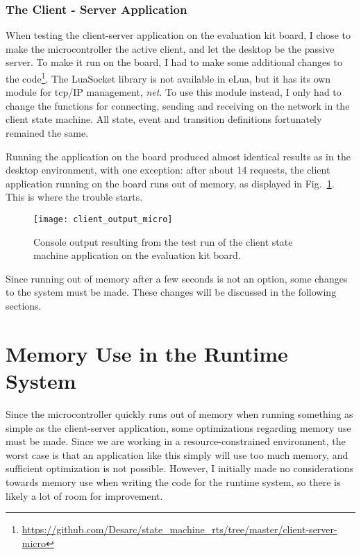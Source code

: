 \subsubsection{The Client - Server Application}
When testing the client-server application on the evaluation kit board, I chose to make the microcontroller the active client, and let the desktop be the passive server. To make it run on the board, I had to make some additional changes to the code\footnote{\url{https://github.com/Desarc/state_machine_rts/tree/master/client-server-micro}}. The LuaSocket library is not available in eLua, but it has its own module for \gls{tcp}/IP management, \emph{net}. To use this module instead, I only had to change the functions for connecting, sending and receiving on the network in the client state machine. All state, event and transition definitions fortunately remained the same.

Running the application on the board produced almost identical results as in the desktop environment, with one exception: after about 14 requests, the client application running on the board runs out of memory, as displayed in Fig.~\ref{fig:client_output_micro}. This is where the trouble starts.

\begin{figure}[htp]
	\centering
	\texttt{[image: client\_output\_micro]}
	\caption[Output of client-server test run (microcontroller)]{Console output resulting from the test run of the client state machine application on the evaluation kit board.}
	\label{fig:client_output_micro}
\end{figure}

Since running out of memory after a few seconds is not an option, some changes to the system must be made. These changes will be discussed in the following sections.

\section{Memory Use in the Runtime System}
\label{sec:memory_use}
Since the microcontroller quickly runs out of memory when running something as simple as the client-server application, some optimizations regarding memory use must be made. Since we are working in a resource-constrained environment, the worst case is that an application like this simply will use too much memory, and sufficient optimization is not possible. However, I initially made no considerations towards memory use when writing the code for the runtime system, so there is likely a lot of room for improvement.


